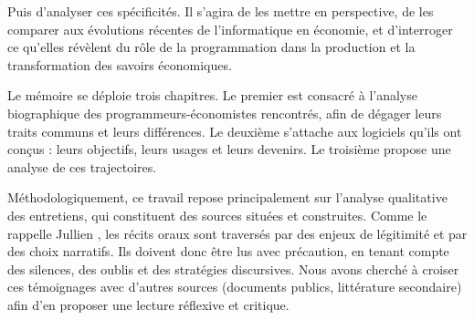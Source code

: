 Puis d'analyser ces spécificités. Il s’agira de les mettre en perspective, de les comparer aux évolutions récentes de l’informatique en économie, et d’interroger ce qu’elles révèlent du rôle de la programmation dans la production et la transformation des savoirs économiques.

Le mémoire se déploie trois chapitres. Le premier est consacré à l’analyse biographique des programmeurs-économistes rencontrés, afin de dégager leurs traits communs et leurs différences. Le deuxième s’attache aux logiciels qu’ils ont conçus : leurs objectifs, leurs usages et leurs devenirs. Le troisième propose une analyse de ces trajectoires.

Méthodologiquement, ce travail repose principalement sur l’analyse qualitative des entretiens, qui constituent des sources situées et construites. Comme le rappelle Jullien \cite{jullienInterviewsMethodologicalHistoriographical2018}, les récits oraux sont traversés par des enjeux de légitimité et par des choix narratifs. Ils doivent donc être lus avec précaution, en tenant compte des silences, des oublis et des stratégies discursives. Nous avons cherché à croiser ces témoignages avec d’autres sources (documents publics, littérature secondaire) afin d'en proposer une lecture réflexive et critique.

